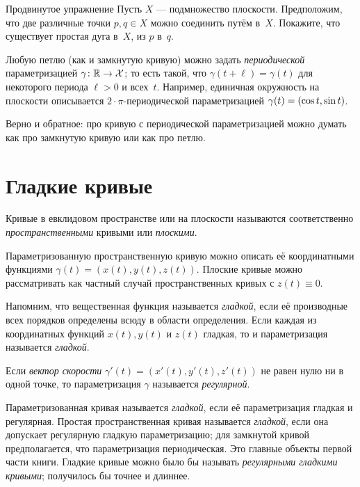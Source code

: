 \begin{thm}{Продвинутое упражнение}\label{aex:simple-curve}
Пусть $X$ --- подмножество плоскости.
Предположим, что две различные точки $p,q\in X$ можно соединить путём в~$X$.
Покажите, что существует простая дуга в~$X$, из $p$ в~$q$.
\end{thm}

Любую петлю (как и замкнутую кривую) можно задать {}\emph{периодической} параметризацией $\gamma\colon \mathbb{R}\to \mathcal{X}$;
то есть такой, что $\gamma(t+\ell)=\gamma(t)$ для некоторого периода $\ell>0$ и всех~$t$.
Например, единичная окружность на плоскости описывается $2{\cdot}\pi$-периодической параметризацией $\gamma(t)\z=(\cos t,\sin t)$.

Верно и обратное: про кривую с периодической параметризацией можно думать как про замкнутую кривую или как про петлю.

\section{Гладкие кривые}\label{sec:Smooth curves}

Кривые в евклидовом пространстве или на плоскости называются соответственно {}\emph{пространственными} кривыми или {}\emph{плоскими}.

Параметризованную пространственную кривую можно описать её координатными функциями 
$\gamma(t)=(x(t),y(t),z(t))$.
Плоские кривые можно рассматривать как частный случай пространственных кривых с $z(t)\equiv 0$.

Напомним, что вещественная функция называется \emph{гладкой}, если её производные всех порядков определены всюду в области определения.  
Если каждая из координатных функций $x(t), y(t)$ и $z(t)$ гладкая, то и параметризация называется \emph{гладкой}.

Если \emph{вектор скорости} 
$\gamma'(t)=(x'(t),y'(t),z'(t))$
не равен нулю ни в одной точке, то параметризация $\gamma$ называется \emph{регулярной}.

Параметризованная кривая называется {}\emph{гладкой}, если её параметризация гладкая и регулярная.
Простая пространственная кривая называется \emph{гладкой}, если она допускает регулярную гладкую параметризацию;
для замкнутой кривой предполагается, что параметризация периодическая.
Это главные объекты первой части книги.
Гладкие кривые можно было бы называть {}\emph{регулярными гладкими кривыми};
получилось бы точнее и длиннее.

